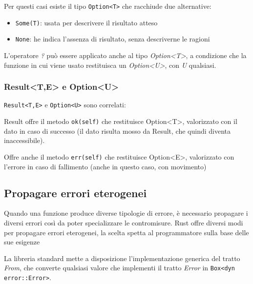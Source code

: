 Per questi casi esiste il tipo \texttt{Option<T>} che racchiude
due alternative:

\begin{itemize}
  \item \texttt{Some(T)}: usata per descrivere il risultato atteso
  \item \texttt{None}: he indica l'assenza di risultato, senza
        descriverne le ragioni
\end{itemize}

L'operatore \textit{?} può essere applicato anche al tipo \textit{Option<T>},
a condizione che la funzione in cui viene usato restituisca un \textit{Option<U>},
con \textit{U} qualsiasi.


\subsubsection{Result<T,E> e Option<U>}
\texttt{Result<T,E>} e \texttt{Option<U>} sono correlati:

Result offre il metodo \texttt{ok(self)} che restituisce Option<T>, valorizzato con il dato in caso di
successo (il dato risulta mosso da Result, che quindi diventa inaccessibile).

Offre anche il metodo \texttt{err(self)} che restituisce Option<E>, valorizzato con l'errore in caso di
fallimento (anche in questo caso, con movimento)


\subsection{Propagare errori eterogenei}
Quando una funzione produce diverse tipologie di errore, è necessario propagare
i diversi errori così da poter specializzare le contromisure. Rust offre
diversi modi per propagare errori eterogenei, la scelta spetta al programmatore
sulla base delle sue esigenze


La libreria standard mette a disposizione l'implementazione generica del tratto
\textit{From}, che converte qualsiasi valore che implementi il tratto \textit{Error}
in \texttt{Box<dyn error::Error>}.



